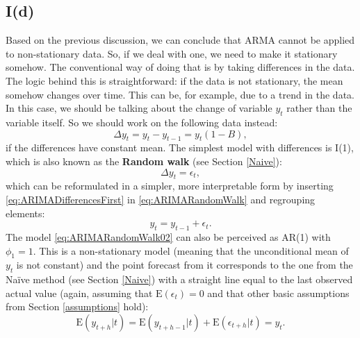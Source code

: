 \documentclass[]{book}
\theoremstyle{definition}
\theoremstyle{definition}
\theoremstyle{definition}
\theoremstyle{definition}
\theoremstyle{remark}
\begin{document}
\hypertarget{Differences}{%
\subsection{I(d)}\label{Differences}}

Based on the previous discussion, we can conclude that ARMA cannot be applied to non-stationary data. So, if we deal with one, we need to make it stationary somehow. The conventional way of doing that is by taking differences in the data. The logic behind this is straightforward: if the data is not stationary, the mean somehow changes over time. This can be, for example, due to a trend in the data. In this case, we should be talking about the change of variable \(y_t\) rather than the variable itself. So we should work on the following data instead:
\begin{equation}
  \Delta y_t = y_t -y_{t-1} = y_t (1 -B),
  \label{eq:ARIMADifferencesFirst}
\end{equation}
if the differences have constant mean. The simplest model with differences is I(1), which is also known as the \textbf{Random walk} (see Section \ref{Naive}):
\begin{equation}
  \Delta y_t = \epsilon_t,
  \label{eq:ARIMARandomWalk}
\end{equation}
which can be reformulated in a simpler, more interpretable form by inserting \eqref{eq:ARIMADifferencesFirst} in \eqref{eq:ARIMARandomWalk} and regrouping elements:
\begin{equation}
  y_t = y_{t-1} + \epsilon_t.
  \label{eq:ARIMARandomWalk02}
\end{equation}
The model \eqref{eq:ARIMARandomWalk02} can also be perceived as AR(1) with \(\phi_1=1\). This is a non-stationary model (meaning that the unconditional mean of \(y_t\) is not constant) and the point forecast from it corresponds to the one from the Naïve method (see Section \ref{Naive}) with a straight line equal to the last observed actual value (again, assuming that \(\mathrm{E}(\epsilon_{t})=0\) and that other basic assumptions from Section \ref{assumptions} hold):
\begin{equation}
  \mathrm{E}(y_{t+h}|t) = \mathrm{E}(y_{t+h-1}|t) + \mathrm{E}(\epsilon_{t+h}|t) = y_{t} .
  \label{eq:ARIMARandomWalkForecast}
\end{equation}
\end{document}
